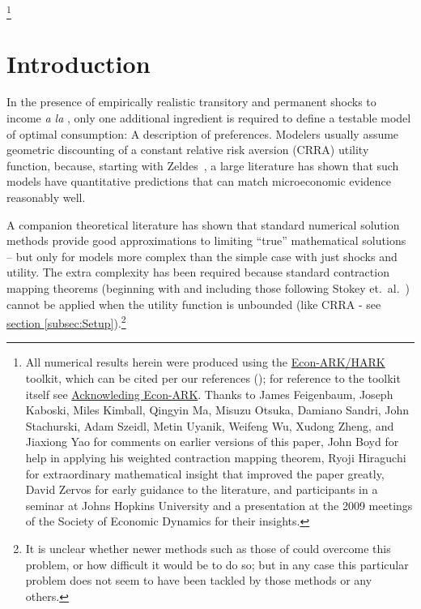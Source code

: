 \documentclass[./BufferStockTheory.tex]{subfiles}
\begin{document}
\thanks{All numerical results herein were produced using the \href{https://econ-ark/HARK}{Econ-ARK/HARK} toolkit, which can be cited per our references (\cite{carroll_et_al-proc-scipy-2018}); for reference to the toolkit itself see \href{https://econ-ark.org/acknowledging/}{Acknowleding Econ-ARK}.  Thanks to James Feigenbaum, Joseph Kaboski, Miles Kimball, Qingyin Ma, Misuzu Otsuka, Damiano Sandri, John Stachurski, Adam Szeidl, Metin Uyanik, Weifeng Wu, Xudong Zheng,
  and Jiaxiong Yao for comments on earlier versions of this paper, John Boyd for help
  in applying his weighted contraction mapping theorem, Ryoji
  Hiraguchi for extraordinary mathematical insight that improved the
  paper greatly, David Zervos for early guidance to the literature,
  and participants in a seminar at Johns Hopkins University and a
  presentation at the 2009 meetings of the Society of Economic
  Dynamics for their insights.}

\titlepagefinish

\newtheorem{defn}{Definition}
\newtheorem{theorem}{Theorem}

\hypertarget{Introduction}{}
\section{Introduction}

\label{sec:intro}





In the presence of empirically realistic transitory and permanent shocks to income \textit{a la} \cite{friedmanATheory}, only one additional ingredient is required to define a testable model of optimal consumption: A description of preferences.  Modelers usually assume geometric discounting of a constant relative risk aversion (CRRA) utility function, because, starting with Zeldes~\citeyearpar{zeldesStochastic}, a large literature has shown that such models have quantitative predictions that can match microeconomic evidence reasonably well.

A companion theoretical literature has shown that standard numerical solution methods provide good approximations to limiting ``true'' mathematical solutions -- but only for models more complex than the simple case with just shocks and utility.  The extra complexity has been required because standard contraction mapping theorems (beginning with \cite{bellmanDynamicProgramming} and including those following Stokey et.~al.~\citeyearpar{slpMethods}) cannot be applied when the utility function is unbounded (like CRRA - see \hyperlink{DiffFromLit}{section \ref{subsec:Setup}}).\footnote{It is unclear whether newer methods such as those of \cite{mnUnique} could overcome this problem, or how difficult it would be to do so; but in any case this particular problem does not seem to have been tackled by those methods or any others.}
\end{document}
